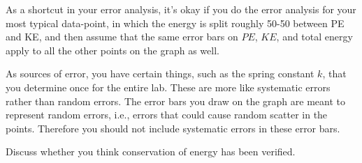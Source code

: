 As a shortcut in your error analysis, it's okay if you
do the error analysis for your most typical data-point, in which
the energy is split roughly 50-50 between PE and KE, and then assume
that the same error bars on $PE$, $KE$, and total energy apply to
all the other points on the graph as well.

As sources of error, you have certain things, such as the spring constant $k$,
that you determine once for the entire lab. These are more like systematic
errors rather than random errors. The error bars you draw on the graph are
meant to represent random errors, i.e., errors that could cause random scatter
in the points. Therefore you should not include systematic errors in these
error bars.

Discuss whether you think conservation of
energy has been verified.
